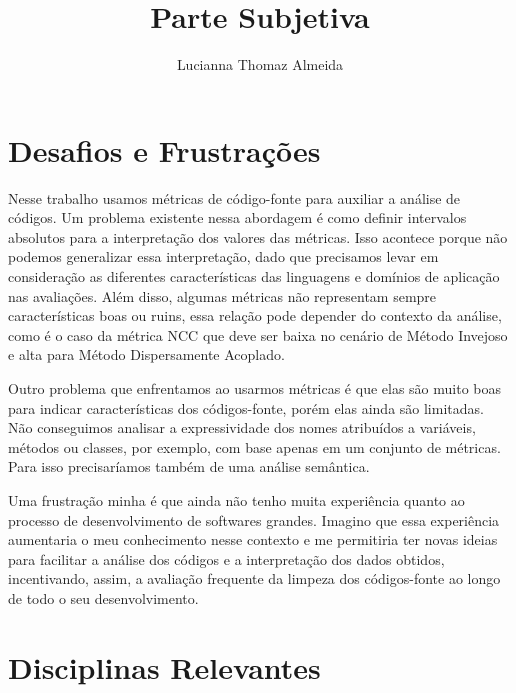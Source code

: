 \documentclass[a4paper, 11pt]{article}
\begin{document}
\onehalfspacing 


\title{Parte Subjetiva}
\author{Lucianna Thomaz Almeida}
\maketitle

\section{Desafios e Frustrações} 
                     
Nesse trabalho usamos métricas de código-fonte para auxiliar a análise de códigos. Um problema existente nessa abordagem é como definir intervalos absolutos para a interpretação dos valores das métricas. Isso acontece porque não podemos generalizar essa interpretação, dado que precisamos levar em consideração as diferentes características das linguagens e domínios de aplicação nas avaliações. Além disso, algumas métricas não representam sempre características boas ou ruins, essa relação pode depender do contexto da análise, como é o caso da métrica NCC que deve ser baixa no cenário de Método Invejoso e alta para Método Dispersamente Acoplado.
                                                                     
Outro problema que enfrentamos ao usarmos métricas é que elas são muito boas para indicar características dos códigos-fonte, porém elas ainda são limitadas. Não conseguimos analisar a expressividade dos nomes atribuídos a variáveis, métodos ou classes, por exemplo, com base apenas em um conjunto de métricas. Para isso precisaríamos também de uma análise semântica.
                                                         
Uma frustração minha é que ainda não tenho muita experiência quanto ao processo de desenvolvimento de softwares grandes. Imagino que essa experiência aumentaria o meu conhecimento nesse contexto e me permitiria ter novas ideias para facilitar a análise dos códigos e a interpretação dos dados obtidos, incentivando, assim, a avaliação frequente da limpeza dos códigos-fonte ao longo de todo o seu desenvolvimento.                                                 

       

\section{Disciplinas Relevantes}                         
                                  
\end{document}
